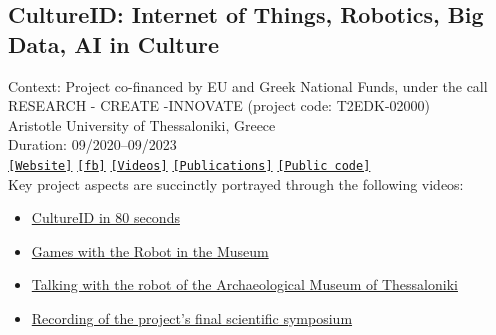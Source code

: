\subsection{CultureID: Internet of Things, Robotics, Big Data, AI in Culture}

\noindent Context: Project co-financed by EU and Greek National Funds, under the call RESEARCH - CREATE -INNOVATE (project code: T2EDK-02000)\\
\noindent Aristotle University of Thessaloniki, Greece\\
\noindent Duration: 09/2020--09/2023\\

\noindent \href{https://cultureid.web.auth.gr/?page_id=216&lang=en}{\texttt{[Website]}} \href{https://www.facebook.com/cultureID.Auth}{\texttt{[fb]}} \href{https://www.youtube.com/@cultureidproject}{\texttt{[Videos]}} \href{https://cultureid.web.auth.gr/?page_id=490}{\texttt{[Publications]}} \href{https://github.com/cultureid-auth-ros-packages}{\texttt{[Public code]}}\\


\noindent Key project aspects are succinctly portrayed through the following videos:

\begin{itemize}
  \singlespacing
  \item \href{https://www.youtube.com/watch?v=SOA0To077WQ}{CultureID in 80 seconds}
  \item \href{https://www.youtube.com/watch?v=2EvTGNOqTrs}{Games with the Robot in the Museum}
  \item \href{https://www.youtube.com/watch?v=mrTL3Gep7Xk}{Talking with the robot of the Archaeological Museum of Thessaloniki}
  \item \href{https://www.youtube.com/watch?v=i5CUBswHWf0}{Recording of the project's final scientific symposium}
\end{itemize}
